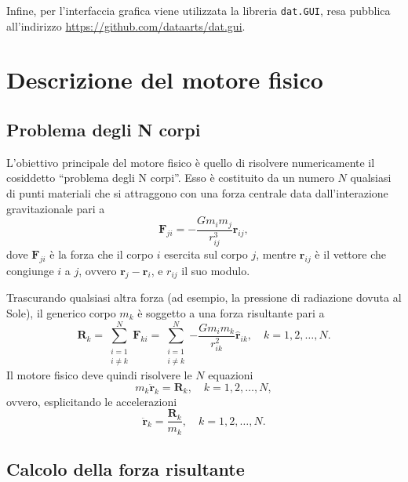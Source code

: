 \documentclass[11pt]{article}
\newcommand{\versor}[1]{\hat{\mathbf{#1}}}
\begin{document}
    Infine, per l'interfaccia grafica viene utilizzata la libreria \texttt{dat.GUI}, resa pubblica all'indirizzo \url{https://github.com/dataarts/dat.gui}.

    \section{Descrizione del motore fisico}

    \subsection{Problema degli N corpi}

    L'obiettivo principale del motore fisico è quello di risolvere numericamente il cosiddetto ``problema degli N corpi''. Esso è costituito\cite{NBodyProblem} da un numero $N$ qualsiasi di punti materiali che si attraggono con una forza centrale data dall'interazione gravitazionale pari a
    \begin{equation}
        \mathbf{F}_{ji} = -\frac{G m_i m_j}{r_{ij}^{3}}\mathbf{r}_{ij}, 
    \end{equation}
    dove $\mathbf{F}_{ji}$ è la forza che il corpo $i$ esercita sul corpo $j$, mentre $\mathbf{r}_{ij}$ è il vettore che congiunge $i$ a $j$, ovvero $\mathbf{r}_j - \mathbf{r}_i$, e $r_{ij}$ il suo modulo.

    Trascurando qualsiasi altra forza (ad esempio, la pressione di radiazione dovuta al Sole), il generico corpo $m_k$ è soggetto a una forza risultante pari a
    \begin{equation}
        \mathbf{R}_k = \sum_{\substack{i = 1\\i \neq k}}^{N}{\mathbf{F}_{ki}} = \sum_{\substack{i = 1\\i \neq k}}^{N}{-\frac{G m_i m_k}{r_{ik}^{2}}\versor{r}_{ik}},\quad k = 1, 2, \dots, N.
    \end{equation}
    Il motore fisico deve quindi risolvere le $N$ equazioni 
    \begin{equation*}
        m_k\ddot{\mathbf{r}}_k = \mathbf{R}_k,\quad k = 1, 2, \dots, N,
    \end{equation*}
	ovvero, esplicitando le accelerazioni
	\begin{equation}\label{eq:accelerazione}
        \ddot{\mathbf{r}}_k = \frac{\mathbf{R}_k}{m_k},\quad k = 1, 2, \dots, N.
    \end{equation}

    \subsection{Calcolo della forza risultante}
\end{document}

